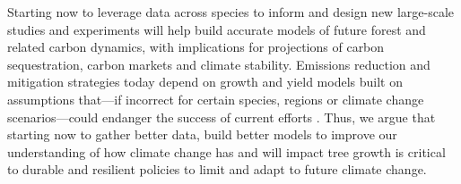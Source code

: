\documentclass[11pt]{article}
\begin{document}
Starting now to leverage data across species to inform and design new large-scale studies and experiments will help build accurate models of future forest and related carbon dynamics, with implications for projections of carbon sequestration, carbon markets and climate stability. Emissions reduction and mitigation strategies today depend on growth and yield models built on assumptions that---if incorrect for certain species, regions or climate change scenarios---could endanger the success of current efforts \citep{ellis2024principles}. Thus, we argue that starting now to gather better data, build better models to improve our understanding of how climate change has and will impact tree growth is critical to durable and resilient policies to limit and adapt to future climate change.

 


\end{document}

